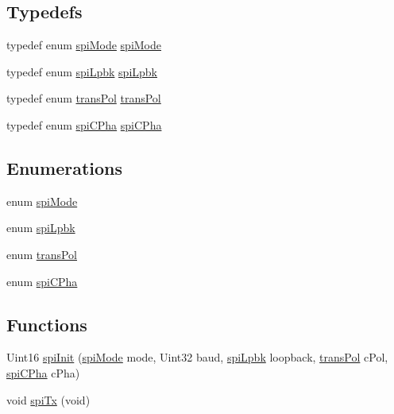 \subsection*{Typedefs}
\begin{DoxyCompactItemize}
\item 
typedef enum \hyperlink{a00051_afb5b84cea8395f82ed709dbd8dcc82ce}{spi\-Mode} \hyperlink{a00051_a6707561b1d595f87f0cf027cdc4f262d}{spi\-Mode}
\item 
typedef enum \hyperlink{a00051_ab94a5ba6760c1a12ee032dd12fffd6a3}{spi\-Lpbk} \hyperlink{a00051_a2709984dcd2ad90d6c4066b0d8d0769a}{spi\-Lpbk}
\item 
typedef enum \hyperlink{a00051_ab694d7b7f6041ac353aa1475e9c39ddc}{trans\-Pol} \hyperlink{a00051_a9d877f7feaeca9d2393e8dbae1aca73d}{trans\-Pol}
\item 
typedef enum \hyperlink{a00051_a0701b982f4dc80e47f32c3419a27f1d9}{spi\-C\-Pha} \hyperlink{a00051_aed8a0ae18613612fe7700f5da26144ba}{spi\-C\-Pha}
\end{DoxyCompactItemize}
\subsection*{Enumerations}
\begin{DoxyCompactItemize}
\item 
enum \hyperlink{a00051_afb5b84cea8395f82ed709dbd8dcc82ce}{spi\-Mode} 
\item 
enum \hyperlink{a00051_ab94a5ba6760c1a12ee032dd12fffd6a3}{spi\-Lpbk} 
\item 
enum \hyperlink{a00051_ab694d7b7f6041ac353aa1475e9c39ddc}{trans\-Pol} 
\item 
enum \hyperlink{a00051_a0701b982f4dc80e47f32c3419a27f1d9}{spi\-C\-Pha} 
\end{DoxyCompactItemize}
\subsection*{Functions}
\begin{DoxyCompactItemize}
\item 
Uint16 \hyperlink{a00051_af60691ee5cb4ab20b305278c6e435511}{spi\-Init} (\hyperlink{a00051_afb5b84cea8395f82ed709dbd8dcc82ce}{spi\-Mode} mode, Uint32 baud, \hyperlink{a00051_ab94a5ba6760c1a12ee032dd12fffd6a3}{spi\-Lpbk} loopback, \hyperlink{a00051_ab694d7b7f6041ac353aa1475e9c39ddc}{trans\-Pol} c\-Pol, \hyperlink{a00051_a0701b982f4dc80e47f32c3419a27f1d9}{spi\-C\-Pha} c\-Pha)
\item 
void \hyperlink{a00051_a2a410bb43bd6e77aa27484add35a009d}{spi\-Tx} (void)
\end{DoxyCompactItemize}


